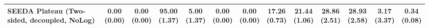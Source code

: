 \begin{table}[H]
{\begin{tabular}{l|cccccc|cccccc}
SEEDA Plateau (Two-sided, decoupled, NoLog) & \makecell{0.00 \\ (0.00)} & \makecell{0.00 \\ (0.00)} & {\cellcolor[HTML]{C8E6C9}} \bfseries \makecell{95.00 \\ (1.37)} & \makecell{5.00 \\ (1.37)} & \makecell{0.00 \\ (0.00)} & \makecell{0.00 \\ (0.00)} & \makecell{17.26 \\ (0.73)} & \makecell{21.44 \\ (1.06)} & {\cellcolor[HTML]{C8E6C9}} \makecell{28.86 \\ (2.51)} & \bfseries \makecell{28.93 \\ (2.58)} & \makecell{3.17 \\ (3.37)} & \makecell{0.34 \\ (0.08)} \\
\bottomrule
\end{tabular}
}%
\end{table}
